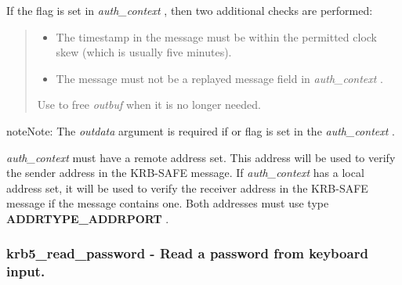 \documentclass[letterpaper,10pt,english]{sphinxmanual}
\begin{document}
If the {\hyperref[appdev/refs/macros/KRB5_AUTH_CONTEXT_DO_TIME:KRB5_AUTH_CONTEXT_DO_TIME]{}} flag is set in \emph{auth\_context} , then two additional checks are performed:
\begin{quote}
\begin{itemize}
\item {} 
The timestamp in the message must be within the permitted clock skew (which is usually five minutes).

\item {} 
The message must not be a replayed message field in \emph{auth\_context} .

\end{itemize}

Use {\hyperref[appdev/refs/api/krb5_free_data_contents:c.krb5_free_data_contents]{}} to free \emph{outbuf} when it is no longer needed.
\end{quote}

\begin{notice}{note}{Note:}
The \emph{outdata} argument is required if {\hyperref[appdev/refs/macros/KRB5_AUTH_CONTEXT_RET_TIME:KRB5_AUTH_CONTEXT_RET_TIME]{}} or {\hyperref[appdev/refs/macros/KRB5_AUTH_CONTEXT_RET_SEQUENCE:KRB5_AUTH_CONTEXT_RET_SEQUENCE]{}} flag is set in the \emph{auth\_context} .

\emph{auth\_context} must have a remote address set. This address will be used to verify the sender address in the KRB-SAFE message. If \emph{auth\_context} has a local address set, it will be used to verify the receiver address in the KRB-SAFE message if the message contains one. Both addresses must use type \textbf{ADDRTYPE\_ADDRPORT} .
\end{notice}


\subsubsection{krb5\_read\_password -  Read a password from keyboard input.}
\label{appdev/refs/api/krb5_read_password:krb5-read-password-read-a-password-from-keyboard-input}\label{appdev/refs/api/krb5_read_password::doc}

\begin{fulllineitems}
\label{appdev/refs/api/krb5_read_password:c.krb5_read_password}
\end{fulllineitems}
\end{document}
